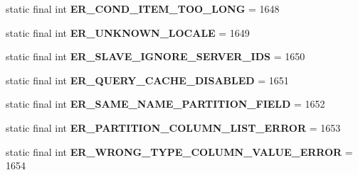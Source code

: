\begin{DoxyCompactItemize}
static final int {\bfseries E\+R\+\_\+\+C\+O\+N\+D\+\_\+\+I\+T\+E\+M\+\_\+\+T\+O\+O\+\_\+\+L\+O\+NG} = 1648
\item 
\mbox{\label{classcom_1_1mysql_1_1cj_1_1exceptions_1_1_mysql_error_numbers_a9eeb37b8080fbbcd5b99cf9d3544626a}} 
static final int {\bfseries E\+R\+\_\+\+U\+N\+K\+N\+O\+W\+N\+\_\+\+L\+O\+C\+A\+LE} = 1649
\item 
\mbox{\label{classcom_1_1mysql_1_1cj_1_1exceptions_1_1_mysql_error_numbers_ad1b2f89e721dfa47330b1b5cf156758c}} 
static final int {\bfseries E\+R\+\_\+\+S\+L\+A\+V\+E\+\_\+\+I\+G\+N\+O\+R\+E\+\_\+\+S\+E\+R\+V\+E\+R\+\_\+\+I\+DS} = 1650
\item 
\mbox{\label{classcom_1_1mysql_1_1cj_1_1exceptions_1_1_mysql_error_numbers_a0c78ba4c75127bdcca66b8f285f34c9f}} 
static final int {\bfseries E\+R\+\_\+\+Q\+U\+E\+R\+Y\+\_\+\+C\+A\+C\+H\+E\+\_\+\+D\+I\+S\+A\+B\+L\+ED} = 1651
\item 
\mbox{\label{classcom_1_1mysql_1_1cj_1_1exceptions_1_1_mysql_error_numbers_aba3e16803e4e1f8e8d23524b1a11bd1f}} 
static final int {\bfseries E\+R\+\_\+\+S\+A\+M\+E\+\_\+\+N\+A\+M\+E\+\_\+\+P\+A\+R\+T\+I\+T\+I\+O\+N\+\_\+\+F\+I\+E\+LD} = 1652
\item 
\mbox{\label{classcom_1_1mysql_1_1cj_1_1exceptions_1_1_mysql_error_numbers_a80c488225af07e57d3d482cec1121306}} 
static final int {\bfseries E\+R\+\_\+\+P\+A\+R\+T\+I\+T\+I\+O\+N\+\_\+\+C\+O\+L\+U\+M\+N\+\_\+\+L\+I\+S\+T\+\_\+\+E\+R\+R\+OR} = 1653
\item 
\mbox{\label{classcom_1_1mysql_1_1cj_1_1exceptions_1_1_mysql_error_numbers_a80c947ad40bcb05b133469defcd0b29f}} 
static final int {\bfseries E\+R\+\_\+\+W\+R\+O\+N\+G\+\_\+\+T\+Y\+P\+E\+\_\+\+C\+O\+L\+U\+M\+N\+\_\+\+V\+A\+L\+U\+E\+\_\+\+E\+R\+R\+OR} = 1654
\item 
\mbox{\label{classcom_1_1mysql_1_1cj_1_1exceptions_1_1_mysql_error_numbers_a0af7cf621ebcf0fbf713925acf278860}} 

\end{DoxyCompactItemize}
